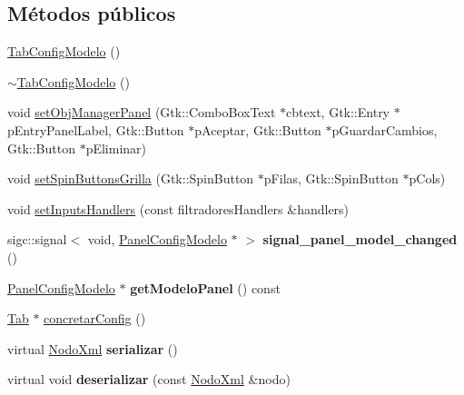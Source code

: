 \subsection*{\-Métodos públicos}
\begin{DoxyCompactItemize}
\item 
\hyperlink{classTabConfigModelo_a6ba3c8496d8deeacc402fdb0fbf920f0}{\-Tab\-Config\-Modelo} ()
\item 
\hyperlink{classTabConfigModelo_a393acb1757380e1f25eccd99aa584555}{$\sim$\-Tab\-Config\-Modelo} ()
\item 
void \hyperlink{classTabConfigModelo_a135996ab60cad9be696481aeac057d07}{set\-Obj\-Manager\-Panel} (\-Gtk\-::\-Combo\-Box\-Text $\ast$cbtext, \-Gtk\-::\-Entry $\ast$p\-Entry\-Panel\-Label, \-Gtk\-::\-Button $\ast$p\-Aceptar, \-Gtk\-::\-Button $\ast$p\-Guardar\-Cambios, \-Gtk\-::\-Button $\ast$p\-Eliminar)
\item 
void \hyperlink{classTabConfigModelo_a43d09874029cc3b58a0aed15701fc23f}{set\-Spin\-Buttons\-Grilla} (\-Gtk\-::\-Spin\-Button $\ast$p\-Filas, \-Gtk\-::\-Spin\-Button $\ast$p\-Cols)
\item 
void \hyperlink{classTabConfigModelo_a41ee8469962d4e76d188583876a85d01}{set\-Inputs\-Handlers} (const filtradores\-Handlers \&handlers)
\item 
\hypertarget{classTabConfigModelo_a5a11b1250a9d1a49e624d3b9a45150db}{sigc\-::signal$<$ void, \*
\hyperlink{classPanelConfigModelo}{\-Panel\-Config\-Modelo} $\ast$ $>$ {\bfseries signal\-\_\-panel\-\_\-model\-\_\-changed} ()}\label{classTabConfigModelo_a5a11b1250a9d1a49e624d3b9a45150db}

\item 
\hypertarget{classTabConfigModelo_ad93fc3ff2f4312e5743adc2f961babc9}{\hyperlink{classPanelConfigModelo}{\-Panel\-Config\-Modelo} $\ast$ {\bfseries get\-Modelo\-Panel} () const }\label{classTabConfigModelo_ad93fc3ff2f4312e5743adc2f961babc9}

\item 
\hyperlink{classTab}{\-Tab} $\ast$ \hyperlink{classTabConfigModelo_aa0386b326ae42e138109082684d95202}{concretar\-Config} ()
\item 
\hypertarget{classTabConfigModelo_a2f38759e1cb2e75d823b81d3147beab8}{virtual \hyperlink{classTiXmlElement}{\-Nodo\-Xml} {\bfseries serializar} ()}\label{classTabConfigModelo_a2f38759e1cb2e75d823b81d3147beab8}

\item 
\hypertarget{classTabConfigModelo_a9c9c382a9519e7c4cce5286fba38b52f}{virtual void {\bfseries deserializar} (const \hyperlink{classTiXmlElement}{\-Nodo\-Xml} \&nodo)}\label{classTabConfigModelo_a9c9c382a9519e7c4cce5286fba38b52f}

\end{DoxyCompactItemize}


